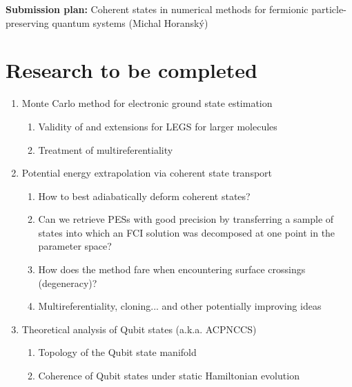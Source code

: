 \documentclass[12pt]{article}
\begin{document}
\thispagestyle{empty}

	\begin{center}
	\textbf{Submission plan:} Coherent states in numerical methods for fermionic particle-preserving quantum systems (Michal Horanský)
	\end{center}
	
	\section{Research to be completed}
	
	\begin{enumerate}
	
	\item Monte Carlo method for electronic ground state estimation
	
	\begin{enumerate}
	
		\item Validity of and extensions for LEGS for larger molecules
		
		\item Treatment of multireferentiality
	
	\end{enumerate}
	
	\item Potential energy extrapolation via coherent state transport
	
	\begin{enumerate}
	
		\item How to best adiabatically deform coherent states?
		
		\item Can we retrieve PESs with good precision by transferring a sample of states into which an FCI solution was decomposed at one point in the parameter space?
		
		\item How does the method fare when encountering surface crossings (degeneracy)?
		
		\item Multireferentiality, cloning... and other potentially improving ideas
	
	\end{enumerate}
	
	\item Theoretical analysis of Qubit states (a.k.a. ACPNCCS)
	
	\begin{enumerate}
	
		\item Topology of the Qubit state manifold
		
		\item Coherence of Qubit states under static Hamiltonian evolution
	
	\end{enumerate}
	
	\end{enumerate}
	
\end{document}
